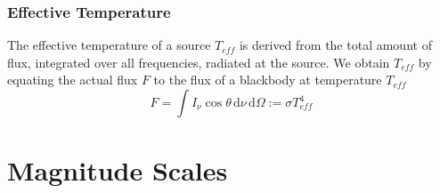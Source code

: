 \subsubsection*{Effective Temperature}

The effective temperature of a source $T_{eff}$ is derived from the total amount of flux, integrated over all frequencies, radiated at the source. We obtain $T_{eff}$ by equating the actual flux $F$ to the flux of a blackbody at temperature $T_{eff}$
\begin{equation}
    F = \int I_{\nu}\cos\theta \,\text{d}\nu\,\text{d}\Omega := \sigma T_{eff}^{4}
    \label{eq:effectivetemperature} 
\end{equation}

\section{Magnitude Scales}

